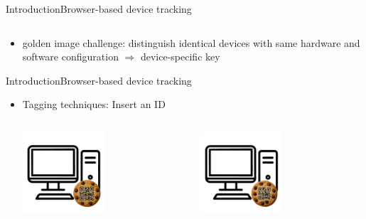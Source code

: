 \documentclass[aspectratio=169, hyperref={colorlinks=true, allcolors=SecondaryColor}, c]{beamer}
\begin{document}
\begin{frame}[fragile]{Introduction}{Browser-based device tracking}
\begin{columns}
\begin{column}{0.33\textwidth}
		\end{column}
	\end{columns}
	\vspace{-0.5cm}
	\begin{itemize}
		\item \alert{golden image challenge:} distinguish identical devices with same hardware and software configuration \checkboxUnchecked \alert{$\Rightarrow$ device-specific key}
	\end{itemize}
\end{frame}

\begin{frame}[fragile]{Introduction}{Browser-based device tracking}
	\begin{itemize}
		\item \alert{Tagging techniques:} Insert an ID
		\begin{columns}
			\begin{column}{0.33\textwidth}
				\includegraphics[width=0.5\textwidth, center]{./figures/computer_alpha_cookie_1.png}
			\end{column}
			\begin{column}{0.33\textwidth}
				\includegraphics[width=0.5\textwidth, center]{./figures/computer_alpha_cookie_2.png}
			\end{column}

\end{columns}
\end{itemize}
\end{frame}
\end{document}
